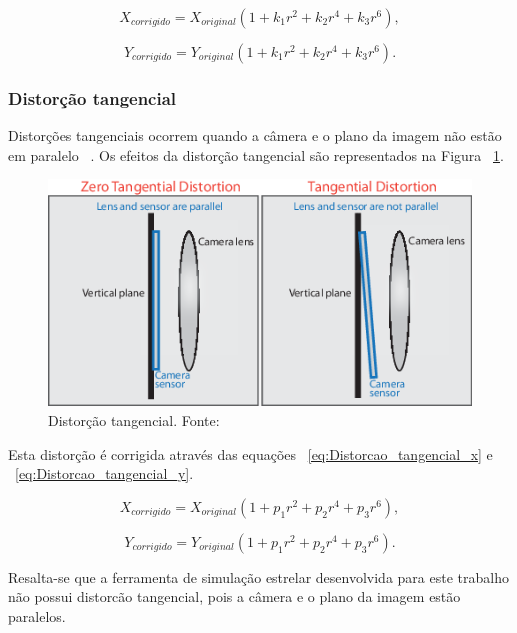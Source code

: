 \begin{equation}
	X_{corrigido} = X_{original} (1 + k_1 r^2 + k_2 r^4 + k_3 r^6),
	\label{eq:Distorcao_radial_x}
\end{equation}

\begin{equation}
	Y_{corrigido} = Y_{original} (1 + k_1 r^2 + k_2 r^4 + k_3 r^6).
	\label{eq:Distorcao_radial_y}
\end{equation}

\subsubsection{Distorção tangencial}
Distorções tangenciais ocorrem quando a câmera e o plano da imagem não estão em paralelo ~\cite[]{ozcakir_2020}.
Os efeitos da distorção tangencial são representados na Figura ~\ref{fig:Distorcao_tangencial}.

\begin{figure}[H]
	\centering
	\includegraphics[width=.7\columnwidth]{images/Distorcao_tangencial.png}
	\caption{Distorção tangencial. Fonte: ~\cite[]{ozcakir_2020}}
	\label{fig:Distorcao_tangencial}
\end{figure}

Esta distorção é corrigida através das equações ~\ref{eq:Distorcao_tangencial_x} e ~\ref{eq:Distorcao_tangencial_y}.

\begin{equation}
	X_{corrigido} = X_{original} (1 + p_1 r^2 + p_2 r^4 + p_3 r^6),
	\label{eq:Distorcao_tangencial_x}
\end{equation}

\begin{equation}
	Y_{corrigido} = Y_{original} (1 + p_1 r^2 + p_2 r^4 + p_3 r^6).
	\label{eq:Distorcao_tangencial_y}
\end{equation}

Resalta-se que a ferramenta de simulação estrelar desenvolvida para este trabalho não possui distorcão tangencial, pois a câmera e o plano da imagem estão paralelos.
